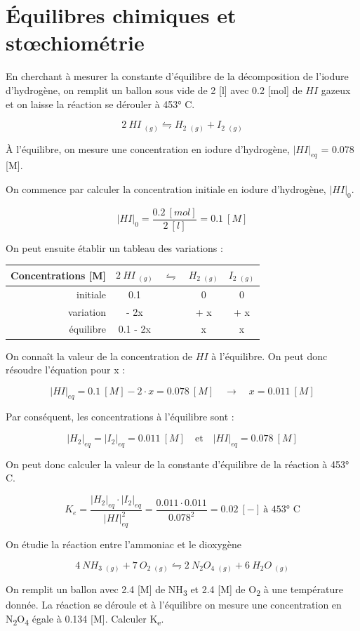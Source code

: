 \documentclass[
  11pt,
  french,
  a4paper,
  openany]{book}
\begin{document}
\hypertarget{uxe9quilibres-chimiques-et-stux153chiomuxe9trie}{%
\section{Équilibres chimiques et stœchiométrie}\label{uxe9quilibres-chimiques-et-stux153chiomuxe9trie}}

En cherchant à mesurer la constante d'équilibre de la décomposition de l'iodure d'hydrogène, on remplit un ballon sous vide de 2 {[}l{]} avec 0.2 {[}mol{]} de \(HI\) gazeux et on laisse la réaction se dérouler à 453° C.

\[
  2\ HI\ _{(g)} \leftrightharpoons H_2\ _{(g)} + I_2\ _{(g)}
\]

À l'équilibre, on mesure une concentration en iodure d'hydrogène, \(|HI|_{eq}\) = 0.078 {[}M{]}.

On commence par calculer la concentration initiale en iodure d'hydrogène, \(|HI|_{0}\).

\[
  |HI|_0 = \frac{0.2\ [mol]}{2\ [l]} = 0.1\ [M]
\]

On peut ensuite établir un tableau des variations :

\begin{longtable}[]{@{}rcccc@{}}
\toprule
Concentrations {[}M{]} & \(2\ HI\ _{(g)}\) & \(\leftrightharpoons\) & \(H_2\ _{(g)}\) & \(I_2\ _{(g)}\)\tabularnewline
\midrule
\endhead
initiale & 0.1 & & 0 & 0\tabularnewline
variation & - 2x & & + x & + x\tabularnewline
équilibre & 0.1 - 2x & & x & x\tabularnewline
\bottomrule
\end{longtable}

On connaît la valeur de la concentration de \(HI\) à l'équilibre. On peut donc résoudre l'équation pour x :

\[
  |HI|_{eq} = 0.1\ [M] - 2 \cdot x = 0.078\ [M] \quad \rightarrow \quad x = 0.011\ [M]
\]

Par conséquent, les concentrations à l'équilibre sont :

\[
  |H_2|_{eq} = |I_2|_{eq} = 0.011\ [M] \quad \text{et} \quad |HI|_{eq} = 0.078\ [M]
\]

On peut donc calculer la valeur de la constante d'équilibre de la réaction à 453° C.

\[
  K_{e} = \frac{|H_2|_{eq} \cdot |I_2|_{eq}}{|HI|_{eq}^2} = \frac{0.011 \cdot 0.011}{0.078^2} = 0.02\ [-]\ \text{à 453° C}
\]

\clearpage

\begin{Exercise}

On étudie la réaction entre l'ammoniac et le dioxygène

\[
  4\ NH_3\ _{(g)} + 7\ O_2\ _{(g)} \leftrightharpoons 2\ N_2O_4\ _{(g)} + 6\ H_2O\ _{(g)}
\]

On remplit un ballon avec 2.4 {[}M{]} de NH\textsubscript{3} et 2.4 {[}M{]} de O\textsubscript{2} à une température donnée. La réaction se déroule et à l'équilibre on mesure une concentration en N\textsubscript{2}O\textsubscript{4} égale à 0.134 {[}M{]}. Calculer K\textsubscript{e}.



\end{Exercise}
\end{document}
